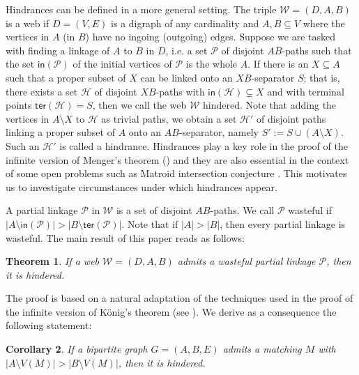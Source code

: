 \documentclass[12pt,a4paper]{amsart}
\theoremstyle{plain}
\newtheorem{theorem}{Theorem}[section]
\newtheorem{corollary}[theorem]{Corollary}
\theoremstyle{definition}
\begin{document}
Hindrances can be defined in a more general setting. The triple $ \mathcal{W}=(D,A,B) $ is a web if $ D=(V,E) $ 
is a digraph of any cardinality and $ A,B\subseteq V $ where the vertices in $ A $ (in $ B $) have no 
ingoing 
(outgoing) edges. Suppose we are tasked with finding a linkage of $ A $ to $ B $ in $ D $, i.e. a set 
$ \mathcal{P} $ of disjoint $ AB $-paths such that the set $ \mathsf{in}(\mathcal{P}) $ of the initial vertices of $ 
\mathcal{P} $ is the whole $ 
A $. If 
there is an $ X\subseteq A $ such that a proper subset of $ X $ can be linked onto an $ XB $-separator $ S $; that is, there exists a 
set $ \mathcal{H} $ of disjoint $ XB $-paths with $ \mathsf{in}(\mathcal{H}) \subsetneq X $ and with terminal points $ 
\mathsf{ter}(\mathcal{H})=S $, then we call the web $ \mathcal{W} $ hindered. Note that adding the vertices in $ 
A\setminus 
X $ to $ \mathcal{H} $ as trivial paths, we obtain a set $ \mathcal{H}' $ of disjoint paths linking a proper subset of $ A $ 
onto 
an $ AB $-separator, namely  $S':=S\cup (A\setminus X )$. Such an $ \mathcal{H}' $ is called a hindrance. 
Hindrances play a key role in the proof of the infinite version of Menger's theorem (\cite[Theorem 1.6]{aharoni2009menger}) 
and they are also essential in 
the context 
of some open 
problems such as Matroid intersection conjecture \cite[Conjecture 1.2]{aharoni1998intersection}. This motivates us to 
investigate 
circumstances under which hindrances appear. 

A partial 
linkage $ \mathcal{P} 
$ in $ \mathcal{W} $ is a set of disjoint $ AB $-paths. We call $ \mathcal{P} $ wasteful if $ \left|A\setminus \mathsf{in}(\mathcal{P})\right|> 
\left|B\setminus \mathsf{ter}(\mathcal{P})\right| $. Note that if 
$ \left|A\right|>\left|B\right| $, then  every partial linkage is wasteful. The main result of this paper reads as follows:

\begin{theorem}\label{thm: main}
If a web $ \mathcal{W}=(D,A,B) $ admits a wasteful partial linkage $ \mathcal{P} $, then it is hindered.
\end{theorem}
The proof is based on a natural adaptation of the techniques used in the proof of the infinite version of König's theorem
(see \cite{aharoni1984konig}). We derive as a consequence 
the following statement:

\begin{corollary}\label{cor: main corollary}
If a bipartite graph $ G=(A,B,E) $ admits a matching $ M $ with $ \left|A\setminus V(M)\right|>\left|B\setminus V(M)\right| 
$, then it is hindered.
\end{corollary}
\end{document}
